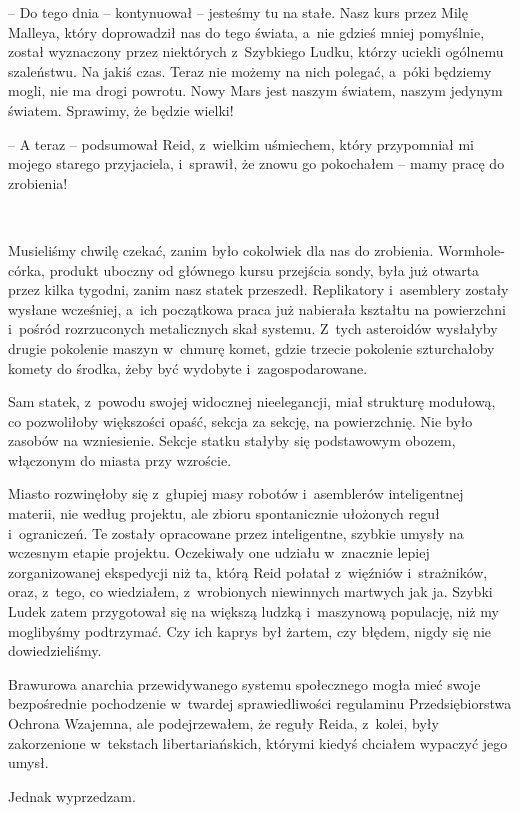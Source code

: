 \documentclass[oneside,polish,11pt,sfheadings]{mwbk}
\begin{document}
-- Do tego dnia -- kontynuował -- jesteśmy tu na stałe. Nasz kurs przez
Milę Malleya, który doprowadził nas do tego świata, a~nie gdzieś mniej
pomyślnie, został wyznaczony przez niektórych z~Szybkiego Ludku, którzy
uciekli ogólnemu szaleństwu. Na jakiś czas. Teraz nie możemy na nich
polegać, a~póki będziemy mogli, nie ma drogi powrotu. Nowy Mars jest
naszym światem, naszym jedynym światem. Sprawimy, że będzie wielki!

-- A teraz -- podsumował Reid, z~wielkim uśmiechem, który przypomniał mi
mojego starego przyjaciela, i~sprawił, że znowu go pokochałem -- mamy
pracę do zrobienia!

~

Musieliśmy chwilę czekać, zanim było cokolwiek dla nas do zrobienia.
Wormhole-córka, produkt uboczny od głównego kursu przejścia sondy, była
już otwarta przez kilka tygodni, zanim nasz statek przeszedł.
Replikatory i~asemblery zostały wysłane wcześniej, a~ich początkowa
praca już nabierała kształtu na powierzchni i~pośród rozrzuconych
metalicznych skał systemu. Z~tych asteroidów wysłałyby drugie pokolenie
maszyn w~chmurę komet, gdzie trzecie pokolenie szturchałoby komety do
środka, żeby być wydobyte i~zagospodarowane.

Sam statek, z~powodu swojej widocznej nieelegancji, miał strukturę
modułową, co pozwoliłoby większości opaść, sekcja za sekcję, na
powierzchnię. Nie było zasobów na wzniesienie. Sekcje statku stałyby się
podstawowym obozem, włączonym do miasta przy wzroście.

Miasto rozwinęłoby się z~głupiej masy robotów i~asemblerów inteligentnej
materii, nie według projektu, ale zbioru spontanicznie ułożonych reguł i~ograniczeń. Te zostały opracowane przez inteligentne, szybkie umysły na
wczesnym etapie projektu. Oczekiwały one udziału w~znacznie lepiej
zorganizowanej ekspedycji niż ta, którą Reid połatał z~więźniów i~strażników, oraz, z~tego, co wiedziałem, z~wrobionych niewinnych
martwych jak ja. Szybki Ludek zatem przygotował się na większą ludzką i~maszynową populację, niż my moglibyśmy podtrzymać. Czy ich kaprys był
żartem, czy błędem, nigdy się nie dowiedzieliśmy.

Brawurowa anarchia przewidywanego systemu społecznego mogła mieć swoje
bezpośrednie pochodzenie w~twardej sprawiedliwości regulaminu
Przedsiębiorstwa Ochrona Wzajemna, ale podejrzewałem, że reguły Reida, z~kolei, były zakorzenione w~tekstach libertariańskich, którymi kiedyś
chciałem wypaczyć jego umysł.

Jednak wyprzedzam.
\end{document}
